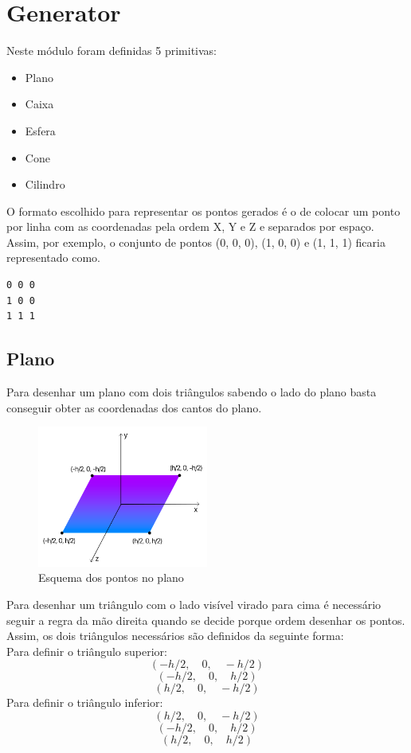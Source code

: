 \documentclass[a4paper]{report}
\begin{document}
\chapter{Generator}
Neste módulo foram definidas 5 primitivas:
\begin{itemize}
        \item Plano
        \item Caixa
        \item Esfera
        \item Cone
        \item Cilindro
\end{itemize}
O formato escolhido para representar os pontos gerados é o de colocar um
ponto por linha com as coordenadas pela ordem X, Y e Z e separados por espaço.\\
Assim, por exemplo, o conjunto de pontos (0, 0, 0), (1, 0, 0) e (1, 1, 1)
ficaria representado como.
\begin{lstlisting}
0 0 0
1 0 0
1 1 1
\end{lstlisting}

\section{Plano}
Para desenhar um plano com dois triângulos sabendo o lado do plano basta
conseguir obter as coordenadas dos cantos do plano.\\
\begin{figure}[H]
    \centering 
    \includegraphics[width=0.5\textwidth]{images/esquema_plano.png}  
    \caption{Esquema dos pontos no plano}
    \label{fig:scheme_plane}
\end{figure}
Para desenhar um triângulo com o lado visível virado para cima é necessário
seguir a regra da mão direita quando se decide porque ordem desenhar os pontos.
Assim, os dois triângulos necessários são definidos da seguinte forma:\\
Para definir o triângulo superior:
\[(-h/2,\quad 0, \quad -h/2)\]
\[(-h/2,\quad  0, \quad h/2)\]
\[(h/2,\quad  0, \quad -h/2)\]
Para definir o triângulo inferior:
\[(h/2, \quad 0, \quad -h/2)\]
\[(-h/2, \quad  0, \quad  h/2)\]
\[(h/2, \quad  0, \quad h/2)\]
\end{document}
